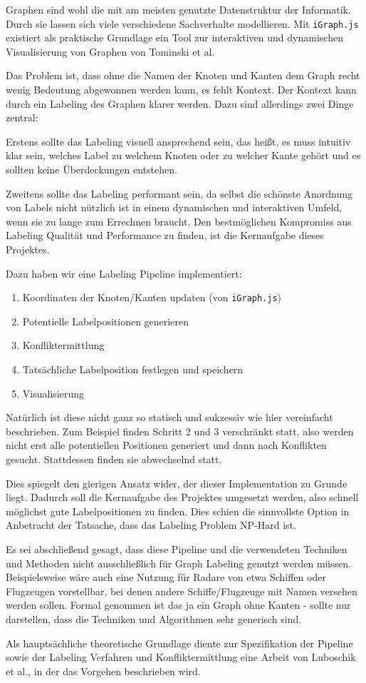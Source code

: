 Graphen sind wohl die mit am meisten genutzte Datenstruktur der Informatik.
Durch sie lassen sich viele verschiedene Sachverhalte modellieren.
Mit \texttt{iGraph.js} existiert als praktische Grundlage ein Tool zur interaktiven und dynamischen Visualisierung von Graphen von Tominski et al.\cite{interactive}

Das Problem ist, dass ohne die Namen der Knoten und Kanten dem Graph recht wenig Bedeutung abgewonnen werden kann,
es fehlt Kontext. Der Kontext kann durch ein Labeling des Graphen klarer werden. Dazu sind allerdings zwei Dinge zentral:

Erstens sollte das Labeling visuell ansprechend sein, das heißt, es muss intuitiv klar sein, welches Label zu welchem Knoten oder zu welcher Kante gehört
und es sollten keine Überdeckungen entstehen.

Zweitens sollte das Labeling performant sein, da selbst die schönste Anordnung von Labels nicht nützlich ist in einem dynamischen und interaktiven Umfeld, wenn sie zu lange zum Errechnen braucht.
Den bestmöglichen Kompromiss aus Labeling Qualität und Performance zu finden, ist die Kernaufgabe dieses Projektes.

Dazu haben wir eine Labeling Pipeline implementiert:
\begin{enumerate}
    \item Koordinaten der Knoten/Kanten updaten (von \texttt{iGraph.js})
    \item Potentielle Labelpositionen generieren
    \item Konfliktermittlung
    \item Tatsächliche Labelposition festlegen und speichern
    \item Visualisierung
\end{enumerate}

Natürlich ist diese nicht ganz so statisch und sukzessiv wie hier vereinfacht beschrieben.
Zum Beispiel finden Schritt 2 und 3 verschränkt statt, also werden nicht erst alle potentiellen Positionen generiert und dann nach Konflikten gesucht.
Stattdessen finden sie abwechselnd statt.

Dies spiegelt den gierigen Ansatz wider, der dieser Implementation zu Grunde liegt. Dadurch soll die Kernaufgabe des Projektes umgesetzt werden,
also schnell möglichst gute Labelpositionen zu finden. Dies schien die sinnvollste Option in Anbetracht der Tatsache, dass das Labeling Problem NP-Hard ist.\cite{nphard}

Es sei abschließend gesagt, dass diese Pipeline und die verwendeten Techniken und Methoden nicht ausschließlich für Graph Labeling genutzt werden müssen.
Beispielsweise wäre auch eine Nutzung für Radare von etwa Schiffen oder Flugzeugen vorstellbar, bei denen andere Schiffe/Flugzeuge mit Namen versehen werden sollen.
Formal genommen ist das ja ein Graph ohne Kanten - sollte nur darstellen, dass die Techniken und Algorithmen sehr generisch sind.

Als hauptsächliche theoretische Grundlage diente zur Spezifikation der Pipeline sowie der Labeling Verfahren und Konfliktermittlung eine Arbeit von Luboschik et al.\cite{main}, in der das Vorgehen beschrieben wird.